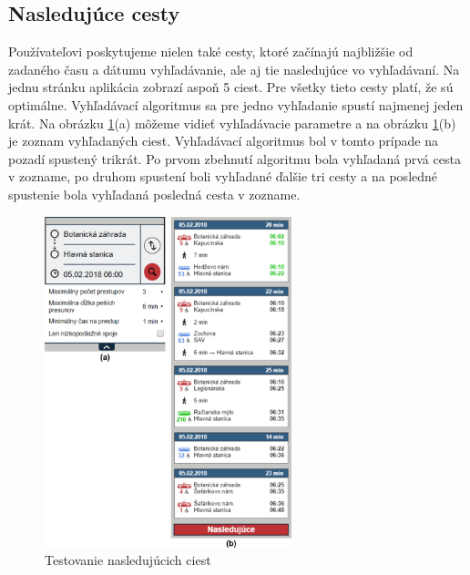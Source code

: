\subsection{Nasledujúce cesty}
Používateľovi poskytujeme nielen také cesty, ktoré začínajú najbližšie od zadaného času a dátumu vyhľadávanie, ale aj tie nasledujúce vo vyhľadávaní. Na jednu stránku aplikácia zobrazí aspoň 5 ciest. Pre všetky tieto cesty platí, že sú optimálne. Vyhľadávací algoritmus sa pre jedno vyhľadanie spustí najmenej jeden krát. Na obrázku \ref{fig:test-next-paths}(a) môžeme vidieť vyhľadávacie parametre a na obrázku \ref{fig:test-next-paths}(b) je zoznam vyhľadaných ciest. Vyhľadávací algoritmus bol v tomto prípade na pozadí spustený trikrát. Po prvom zbehnutí algoritmu bola vyhľadaná prvá cesta v zozname, po druhom spustení boli vyhľadané ďalšie tri cesty a na posledné spustenie bola vyhľadaná posledná cesta v zozname.

\begin{figure}[H]
\centerline{\includegraphics[width=0.64\textwidth]{images/test/next-paths-1}}
\caption[Testovanie nasledujúcich ciest]{Testovanie nasledujúcich ciest}
\label{fig:test-next-paths}
\end{figure}



